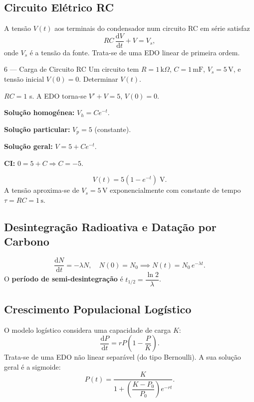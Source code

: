 \documentclass[12pt, a4paper]{article}
\newcommand{\dd}{\mathrm{d}}
\begin{document}
\subsection{Circuito Elétrico RC}

A tensão $V(t)$ aos terminais do condensador num circuito RC em série satisfaz
\[
  RC\,\frac{\dd V}{\dd t} + V = V_s,
\]
onde $V_s$ é a tensão da fonte. Trata-se de uma EDO linear de primeira ordem.

\begin{exbox}{6 --- Carga de Circuito RC}
  Um circuito tem $R=1\,\mathrm{k}\Omega$, $C=1\,\mathrm{mF}$, $V_s = 5\,\mathrm{V}$,
  e tensão inicial $V(0)=0$. Determinar $V(t)$.
\end{exbox}

\begin{solbox}
  $RC = 1$ s. A EDO torna-se $V' + V = 5$, $V(0)=0$.

  \textbf{Solução homogénea:} $V_h = Ce^{-t}$.

  \textbf{Solução particular:} $V_p = 5$ (constante).

  \textbf{Solução geral:} $V = 5 + Ce^{-t}$.

  \textbf{CI:} $0 = 5 + C \Rightarrow C=-5$.

  \[
    \boxed{V(t) = 5\!\left(1 - e^{-t}\right)\;\mathrm{V}.}
  \]
  A tensão aproxima-se de $V_s = 5\,\mathrm{V}$ exponencialmente com constante de tempo
  $\tau = RC = 1\,\mathrm{s}$.
\end{solbox}

\subsection{Desintegração Radioativa e Datação por Carbono}

\[
  \frac{\dd N}{\dd t} = -\lambda N, \quad N(0)=N_0
  \implies N(t) = N_0\,e^{-\lambda t}.
\]
O \textbf{período de semi-desintegração} é $t_{1/2} = \dfrac{\ln 2}{\lambda}$.

\subsection{Crescimento Populacional Logístico}

O modelo logístico considera uma capacidade de carga $K$:
\[
  \frac{\dd P}{\dd t} = rP\!\left(1-\frac{P}{K}\right).
\]
Trata-se de uma EDO não linear separável (do tipo Bernoulli). A sua solução geral é a sigmoide:
\[
  P(t) = \frac{K}{1 + \!\left(\dfrac{K-P_0}{P_0}\right)\!e^{-rt}}.
\]
\end{document}
